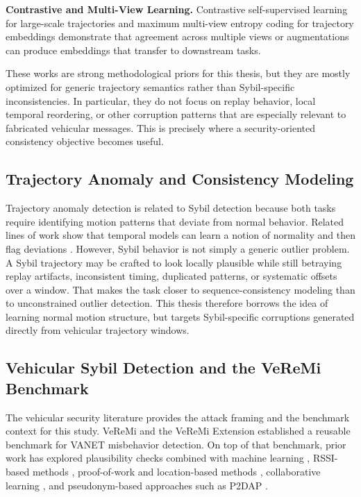 \documentclass[12pt]{article}
\begin{document}
\textbf{Contrastive and Multi-View Learning.} Contrastive self-supervised learning for large-scale trajectories \cite{chen2023self} and maximum multi-view entropy coding for trajectory embeddings \cite{lin2023pre} demonstrate that agreement across multiple views or augmentations can produce embeddings that transfer to downstream tasks.

These works are strong methodological priors for this thesis, but they are mostly optimized for generic trajectory semantics rather than Sybil-specific inconsistencies. In particular, they do not focus on replay behavior, local temporal reordering, or other corruption patterns that are especially relevant to fabricated vehicular messages. This is precisely where a security-oriented consistency objective becomes useful.

\subsection{Trajectory Anomaly and Consistency Modeling}

Trajectory anomaly detection is related to Sybil detection because both tasks require identifying motion patterns that deviate from normal behavior. Related lines of work show that temporal models can learn a notion of normality and then flag deviations \cite{jiang2023start,chen2023self}. However, Sybil behavior is not simply a generic outlier problem. A Sybil trajectory may be crafted to look locally plausible while still betraying replay artifacts, inconsistent timing, duplicated patterns, or systematic offsets over a window. That makes the task closer to sequence-consistency modeling than to unconstrained outlier detection. This thesis therefore borrows the idea of learning normal motion structure, but targets Sybil-specific corruptions generated directly from vehicular trajectory windows.

\subsection{Vehicular Sybil Detection and the VeReMi Benchmark}

The vehicular security literature provides the attack framing and the benchmark context for this study. VeReMi \cite{van2018veremi} and the VeReMi Extension \cite{van2020veremi} established a reusable benchmark for VANET misbehavior detection. On top of that benchmark, prior work has explored plausibility checks combined with machine learning \cite{so2018integrating}, RSSI-based methods \cite{yao2019multi}, proof-of-work and location-based methods \cite{baza2022detecting}, collaborative learning \cite{azam2022collaborative}, and pseudonym-based approaches such as P2DAP \cite{zhou2011p2dap}.
\end{document}
